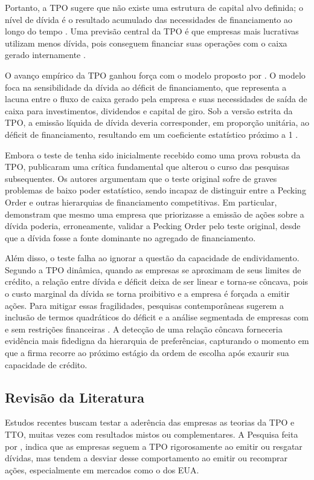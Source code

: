 \documentclass[a4paper,12pt]{article}
\begin{document}
Portanto, a TPO sugere que não existe uma estrutura de capital alvo definida; o nível de dívida é o resultado acumulado das necessidades de financiamento ao longo do tempo \cite{shyam1999}. Uma previsão central da TPO é que empresas mais lucrativas utilizam menos dívida, pois conseguem financiar suas operações com o caixa gerado internamente \cite{Souza2024, ross2015}.

O avanço empírico da TPO ganhou força com o modelo proposto por . O modelo foca na sensibilidade da dívida ao déficit de financiamento, que representa a lacuna entre o fluxo de caixa gerado pela empresa e suas necessidades de saída de caixa para investimentos, dividendos e capital de giro. Sob a versão estrita da TPO, a emissão líquida de dívida deveria corresponder, em proporção unitária, ao déficit de financiamento, resultando em um coeficiente estatístico próximo a 1 \cite{shyam1999}.
 
Embora o teste de  tenha sido inicialmente recebido como uma prova robusta da TPO,  publicaram uma crítica fundamental que alterou o curso das pesquisas subsequentes. Os autores argumentam que o teste original sofre de graves problemas de baixo poder estatístico, sendo incapaz de distinguir entre a Pecking Order e outras hierarquias de financiamento competitivas. Em particular,  demonstram que mesmo uma empresa que priorizasse a emissão de ações sobre a dívida poderia, erroneamente, validar a Pecking Order pelo teste original, desde que a dívida fosse a fonte dominante no agregado de financiamento.
 
Além disso, o teste falha ao ignorar a questão da capacidade de endividamento. Segundo a TPO dinâmica, quando as empresas se aproximam de seus limites de crédito, a relação entre dívida e déficit deixa de ser linear e torna-se côncava, pois o custo marginal da dívida se torna proibitivo e a empresa é forçada a emitir ações. Para mitigar essas fragilidades, pesquisas contemporâneas sugerem a inclusão de termos quadráticos do déficit e a análise segmentada de empresas com e sem restrições financeiras \cite{chirinko2000}. A detecção de uma relação côncava forneceria evidência mais fidedigna da hierarquia de preferências, capturando o momento em que a firma recorre ao próximo estágio da ordem de escolha após exaurir sua capacidade de crédito.

\subsection{Revisão da Literatura}
Estudos recentes buscam testar a aderência das empresas as teorias da TPO e TTO, muitas vezes com resultados mistos ou complementares. A Pesquisa feita por , indica que as empresas seguem a TPO rigorosamente ao emitir ou resgatar dívidas, mas tendem a desviar desse comportamento ao emitir ou recomprar ações, especialmente em mercados como o dos EUA.
\end{document}
